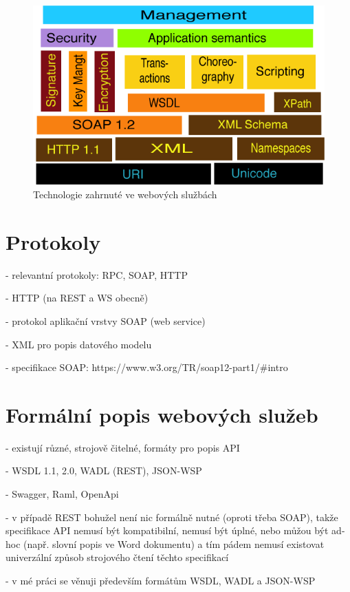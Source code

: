 \documentclass[czech,DP]{thesiskiv}
\begin{document}
\begin{figure}
	\centering
	\includegraphics[width=\linewidth]{ws-tech-stack.png}
	\caption{Technologie zahrnuté ve webových službách}
	\label{fig:ws-tech-stack}	
\end{figure}

\section{Protokoly}

- relevantní protokoly: RPC, SOAP, HTTP

- HTTP (na REST a WS obecně)

- protokol aplikační vrstvy SOAP (web service)

- XML pro popis datového modelu

- specifikace SOAP: https://www.w3.org/TR/soap12-part1/\#intro

\section{Formální popis webových služeb}

- existují různé, strojově čitelné, formáty pro popis API

- WSDL 1.1, 2.0, WADL (REST), JSON-WSP

- Swagger, Raml, OpenApi

- v případě REST bohužel není nic formálně nutné (oproti třeba SOAP), takže specifikace API nemusí být kompatibilní, nemusí být úplné, nebo můžou být ad-hoc (např. slovní popis ve Word dokumentu) a tím pádem nemusí existovat univerzální způsob strojového čtení těchto specifikací

- v mé práci se věnuji především formátům WSDL, WADL a JSON-WSP
 
\end{document}
